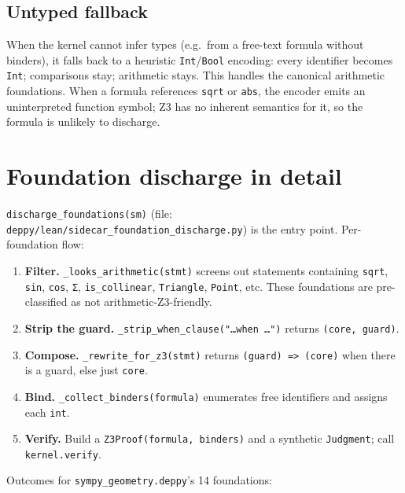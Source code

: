 \subsection{Untyped fallback}

When the kernel cannot infer types (e.g.\ from a free-text formula
without binders), it falls back to a heuristic
\texttt{Int}/\texttt{Bool} encoding: every identifier becomes
\texttt{Int}; comparisons stay; arithmetic stays.  This handles the
canonical arithmetic foundations.  When a formula references
\texttt{sqrt} or \texttt{abs}, the encoder emits an uninterpreted
function symbol; Z3 has no inherent semantics for it, so the
formula is unlikely to discharge.

\section{Foundation discharge in detail}
\label{sec:foundation-discharge-z3}

\texttt{discharge\_foundations(sm)} (file:
\texttt{deppy/lean/sidecar\_foundation\_discharge.py}) is the entry
point.  Per-foundation flow:

\begin{enumerate}[leftmargin=1.7em]
  \item \textbf{Filter.}  \texttt{\_looks\_arithmetic(stmt)} screens
    out statements containing \texttt{sqrt}, \texttt{sin}, \texttt{cos},
    \texttt{Σ}, \texttt{is\_collinear}, \texttt{Triangle},
    \texttt{Point}, etc.  These foundations are pre-classified as
    not arithmetic-Z3-friendly.
  \item \textbf{Strip the guard.}
    \texttt{\_strip\_when\_clause("\dots when \dots")} returns
    \texttt{(core, guard)}.
  \item \textbf{Compose.}
    \texttt{\_rewrite\_for\_z3(stmt)} returns
    \texttt{(guard) => (core)} when there is a guard, else just
    \texttt{core}.
  \item \textbf{Bind.}  \texttt{\_collect\_binders(formula)}
    enumerates free identifiers and assigns each \texttt{int}.
  \item \textbf{Verify.}  Build a \texttt{Z3Proof(formula,
    binders)} and a synthetic \texttt{Judgment}; call
    \texttt{kernel.verify}.
\end{enumerate}

Outcomes for \texttt{sympy\_geometry.deppy}'s 14 foundations:

